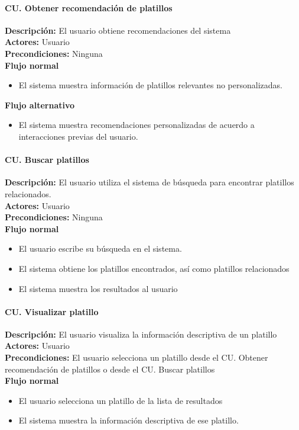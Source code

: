     \paragraph{CU. Obtener recomendación de platillos\\} 
    \textbf{Descripción:} El usuario obtiene recomendaciones del sistema\\
    \textbf{Actores:} Usuario \\
    \textbf{Precondiciones:} Ninguna \\
    \textbf{Flujo normal}\\
    \begin{itemize}
      \item El sistema muestra información de platillos relevantes no personalizadas.
    \end{itemize}
    \textbf{Flujo alternativo}\\
    \begin{itemize}
      \item El sistema muestra recomendaciones personalizadas de acuerdo a interacciones previas del usuario.
    \end{itemize}

    \paragraph{CU. Buscar platillos\\}
    \textbf{Descripción:} El usuario utiliza el sistema de búsqueda para encontrar platillos relacionados.\\
    \textbf{Actores:} Usuario\\
    \textbf{Precondiciones:} Ninguna\\
    \textbf{Flujo normal}\\
    \begin{itemize}
      \item El usuario escribe su búsqueda en el sistema. 
      \item El sistema obtiene los platillos encontrados, así como platillos relacionados
      \item El sistema muestra los resultados al usuario
    \end{itemize}

    \paragraph{CU. Visualizar platillo\\}
    \textbf{Descripción:} El usuario visualiza la información descriptiva de un platillo\\
    \textbf{Actores:} Usuario\\
    \textbf{Precondiciones:} El usuario selecciona un platillo desde el CU. Obtener recomendación de platillos o desde el CU. Buscar platillos\\
    \textbf{Flujo normal}\\
    \begin{itemize}
      \item El usuario selecciona un platillo de la lista de resultados
      \item El sistema muestra la información descriptiva de ese platillo.
    \end{itemize}

